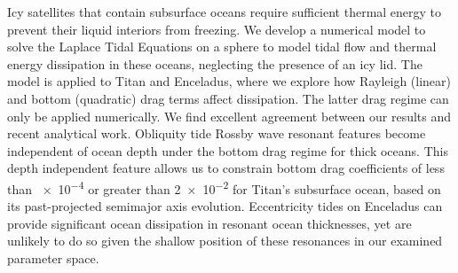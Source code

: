Icy satellites that contain subsurface oceans require sufficient thermal energy to prevent their liquid interiors from freezing. We develop a numerical model to solve the Laplace Tidal Equations on a sphere to model tidal flow and thermal energy dissipation in these oceans, neglecting the presence of an icy lid. The model is applied to Titan and Enceladus, where we explore how Rayleigh (linear) and bottom (quadratic) drag terms affect dissipation. The latter drag regime can only be applied numerically. We find excellent agreement between our results and recent analytical work. Obliquity tide Rossby wave resonant features become independent of ocean depth under the bottom drag regime for thick oceans. This depth independent feature allows us to constrain bottom drag coefficients of less than \num{e-4} or greater than \num{2e-2} for Titan's subsurface ocean, based on its past-projected semimajor axis evolution. Eccentricity tides on Enceladus can provide significant ocean dissipation in resonant ocean thicknesses, yet are unlikely to do so given the shallow position of these resonances in our examined parameter space.